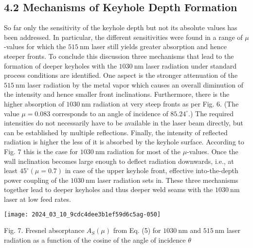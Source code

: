 \documentclass[10pt]{article}
\begin{document}
\subsection*{4.2 Mechanisms of Keyhole Depth Formation}
So far only the sensitivity of the keyhole depth but not its absolute values has been addressed. In particular, the different sensitivities were found in a range of $\mu$-values for which the $515 \mathrm{~nm}$ laser still yields greater absorption and hence steeper fronts. To conclude this discussion three mechanisms that lead to the formation of deeper keyholes with the $1030 \mathrm{~nm}$ laser radiation under standard process conditions are identified. One aspect is the stronger attenuation of the $515 \mathrm{~nm}$ laser radiation by the metal vapor which causes an overall diminution of the intensity and hence smaller front inclinations. Furthermore, there is the higher absorption of $1030 \mathrm{~nm}$ radiation at very steep fronts as per Fig. 6. (The value $\mu=0.083$ corresponds to an angle of incidence of $85.24^{\circ}$.) The required intensities do not necessarily have to be available in the laser beam directly, but can be established by multiple reflections. Finally, the intensity of reflected radiation is higher the less of it is absorbed by the keyhole surface. According to Fig. 7 this is the case for $1030 \mathrm{~nm}$ radiation for most of the $\mu$-values. Once the wall inclination becomes large enough to deflect radiation downwards, i.e., at least $45^{\circ}(\mu=0.7)$ in case of the upper keyhole front, effective into-the-depth power coupling of the $1030 \mathrm{~nm}$ laser radiation sets in. These three mechanisms together lead to deeper keyholes and thus deeper weld seams with the $1030 \mathrm{~nm}$ laser at low feed rates.

\begin{center}
\texttt{[image: 2024\_03\_10\_9cdc4dee3b1ef59d6c5ag-050]}
\end{center}

Fig. 7. Fresnel absorptance $A_{S}(\mu)$ from Eq. (5) for $1030 \mathrm{~nm}$ and $515 \mathrm{~nm}$ laser radiation as a function of the cosine of the angle of incidence $\theta$
\end{document}
